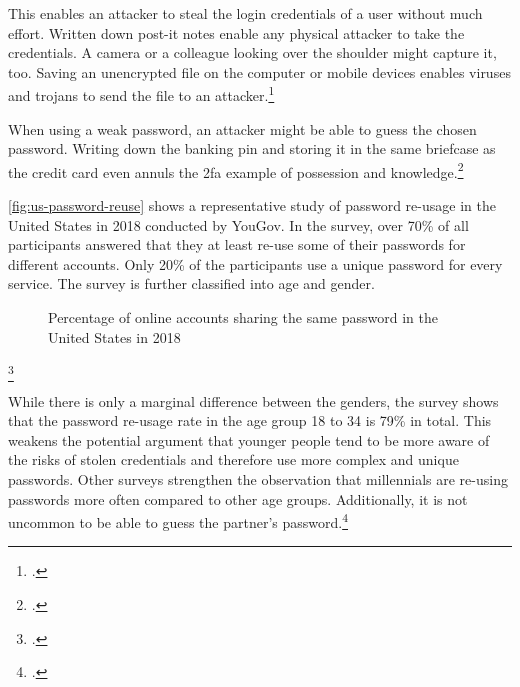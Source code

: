 This enables an attacker to steal the login credentials of a user without much effort. Written down post-it notes enable any physical attacker to take the credentials. A camera or a colleague looking over the shoulder might capture it, too. Saving an unencrypted file on the computer or mobile devices enables viruses and trojans to send the file to an attacker.\footcites[See][Chapter 4.1]{kissell2019take}

When using a weak password, an attacker might be able to guess the chosen password. Writing down the banking \gls{pin} and storing it in the same briefcase as the credit card even annuls the \gls{2fa} example of possession and knowledge.\footcites[See][xxi]{swenson2012modern}

\autoref{fig:us-password-reuse} shows a representative study of password re-usage in the United States in 2018 conducted by YouGov. In the survey, over 70\% of all participants answered that they at least re-use some of their passwords for different accounts. Only 20\% of the participants use a unique password for every service. The survey is further classified into age and gender. 

\begin{figure}[h]
	\begin{bchart}[min=5, max=55, step=10, unit=\%, scale=1.2]
		\medskip
		\medskip
		\bigskip
		\bigskip
	\end{bchart}
	\caption[Percentage of online accounts sharing the same password in the United States in 2018]{Percentage of online accounts sharing the same password in the United States in 2018\footnotemark}
	\label{fig:us-password-reuse}
\end{figure}
\footcitetext[Source:][8]{yougov}

While there is only a marginal difference between the genders, the survey shows that the password re-usage rate in the age group 18 to 34 is 79\% in total. This weakens the potential argument that younger people tend to be more aware of the risks of stolen credentials and therefore use more complex and unique passwords. Other surveys strengthen the observation that millennials are re-using passwords more often compared to other age groups. Additionally, it is not uncommon to be able to guess the partner's password.\footcites[See][10]{ibm-security}[See][8]{yougov}[See][11]{lastpass}[See][1429]{Thomas:2017:DBP:3133956.3134067}[See][11]{lastpass}

